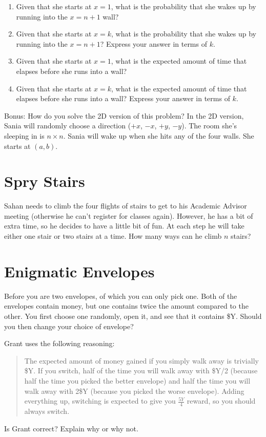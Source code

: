 \documentclass{article}
\begin{document}
\begin{enumerate}[label=(\alph*)]
\itemsep0em
    \item Given that she starts at $x = 1$, what is the probability that she wakes up by running into the $x = n + 1$ wall?\vfill
    
    \item Given that she starts at $x = k$, what is the probability that she wakes up by running into the $x = n + 1$? Express your answer in terms of $k$.\vfill
    
    \item Given that she starts at $x = 1$, what is the expected amount of time that elapses before she runs into a wall?\vfill
    
    \item Given that she starts at $x = k$, what is the expected amount of time that elapses before she runs into a wall? Express your answer in terms of $k$.\vfill
\end{enumerate}

Bonus: How do you solve the 2D version of this problem? In the 2D version, Sania will randomly choose a direction ($+x$, $-x$, $+y$, $-y$). The room she's sleeping in is $n \times n$. Sania will wake up when she hits any of the four walls. She starts at $(a, b)$.

\newpage

\section{Spry Stairs}

Sahan needs to climb the four flights of stairs to get to his Academic Advisor meeting (otherwise he can't register for classes again). However, he has a bit of extra time, so he decides to have a little bit of fun. At each step he will take either one stair or two stairs at a time. How many ways can he climb $n$ stairs?\vfill

\section{Enigmatic Envelopes}

Before you are two envelopes, of which you can only pick one. Both of the envelopes contain money, but one contains twice the amount compared to the other. You first choose one randomly, open it, and see that it contains \$Y. Should you then change your choice of envelope?

Grant uses the following reasoning:

\begin{quote}
    The expected amount of money gained if you simply walk away is trivially \$Y. If you switch, half of the time you will walk away with \$Y/2 (because half the time you picked the better envelope) and half the time you will walk away with 2\$Y (because you picked the worse envelope). Adding everything up, switching is expected to give you $\frac{5Y}{4}$ reward, so you should always switch.
\end{quote}

Is Grant correct? Explain why or why not.

\vfill
\end{document}
